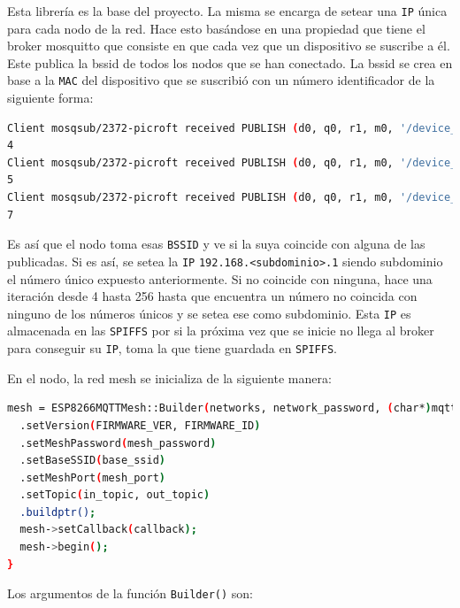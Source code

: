 Esta librería es la base del proyecto. La misma se encarga de setear una \lstinline[columns=fixed]{IP} única para cada nodo de la red. Hace esto basándose en una propiedad que tiene el broker mosquitto que consiste en que cada vez que un dispositivo se suscribe a él. Este publica la bssid de todos los nodos que se han conectado. La bssid se crea en base a la \lstinline[columns=fixed]{MAC} del dispositivo que se suscribió con un número identificador de la siguiente forma: 

\begin{lstlisting}[language=bash]
Client mosqsub/2372-picroft received PUBLISH (d0, q0, r1, m0, '/device_in/bssid/2E:3A:E8:11:60:A3', ... (1 bytes))
4
Client mosqsub/2372-picroft received PUBLISH (d0, q0, r1, m0, '/device_in/bssid/5E:CF:7F:B4:69:06', ... (1 bytes))
5
Client mosqsub/2372-picroft received PUBLISH (d0, q0, r1, m0, '/device_in/bssid/2E:3A:E8:0F:43:95', ... (1 bytes))
7
\end{lstlisting}

Es así que el nodo toma esas \lstinline[columns=fixed]{BSSID} y ve si la suya coincide con alguna de las publicadas. Si es así, se setea la \lstinline[columns=fixed]{IP} \lstinline[columns=fixed]{192.168.<subdominio>.1} siendo subdominio el número único expuesto anteriormente. Si no coincide con ninguna, hace una iteración desde 4 hasta 256 hasta que encuentra un número no coincida con ninguno de los números únicos y se setea ese como subdominio. Esta \lstinline[columns=fixed]{IP} es almacenada en las \lstinline[columns=fixed]{SPIFFS} por si la próxima vez que se inicie no llega al broker para conseguir su \lstinline[columns=fixed]{IP}, toma la que tiene guardada en \lstinline[columns=fixed]{SPIFFS}.

En el nodo, la red mesh se inicializa de la siguiente manera:

\begin{lstlisting}[language=bash]
mesh = ESP8266MQTTMesh::Builder(networks, network_password, (char*)mqtt_server, mqtt_port)
  .setVersion(FIRMWARE_VER, FIRMWARE_ID)
  .setMeshPassword(mesh_password)
  .setBaseSSID(base_ssid)
  .setMeshPort(mesh_port)
  .setTopic(in_topic, out_topic)
  .buildptr();
  mesh->setCallback(callback);
  mesh->begin();
}
\end{lstlisting}

Los argumentos de la función \lstinline[columns=fixed]{Builder()} son:

